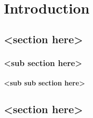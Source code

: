 \chapter{Introduction}

\section{<section here>}

\subsection{<sub section here>}

\blindtext

\subsubsection{<sub sub section here>}

\blindtext


\section{<section here>}

\blindtext